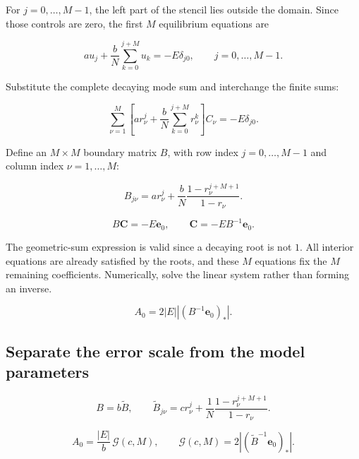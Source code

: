\documentclass[10pt,a4paper]{article}
\begin{document}
For $j=0,\ldots,M-1$, the left part of the stencil
lies outside the domain.
Since those controls are zero, the first $M$
equilibrium equations are

\begin{equation}
a u_j
+
\frac{b}{N}\sum_{k=0}^{j+M}u_k
=
-E\delta_{j0},
\qquad
j=0,\ldots,M-1.
\end{equation}

Substitute the complete decaying mode sum and
interchange the finite sums:

\begin{equation}
\sum_{\nu=1}^{M}
\left[
a r_\nu^j
+
\frac{b}{N}\sum_{k=0}^{j+M}r_\nu^k
\right]C_\nu
=
-E\delta_{j0}.
\end{equation}

Define an $M\times M$ boundary matrix $B$,
with row index $j=0,\ldots,M-1$ and
column index $\nu=1,\ldots,M$:

\begin{equation}
B_{j\nu}
=
a r_\nu^j
+
\frac{b}{N}
\frac{1-r_\nu^{j+M+1}}{1-r_\nu}.
\end{equation}

\begin{equation}
B\mathbf C=-E\mathbf e_0,
\qquad
\mathbf C=-E B^{-1}\mathbf e_0.
\end{equation}

The geometric-sum expression is valid since a
decaying root is not $1$.
All interior equations are already satisfied
by the roots, and these $M$ equations fix the
$M$ remaining coefficients.
Numerically, solve the linear system rather than
forming an inverse.

\begin{equation}
A_0
=
2|E|
\left|
\left(B^{-1}\mathbf e_0\right)_*
\right|.
\end{equation}

\subsection*{Separate the error scale from the model parameters}

\begin{equation}
B=b\widetilde B,
\qquad
\widetilde B_{j\nu}
=
c r_\nu^j
+
\frac{1}{N}
\frac{1-r_\nu^{j+M+1}}{1-r_\nu}.
\end{equation}

\begin{equation}
\boxed{
A_0=\frac{|E|}{b}\,\mathcal G(c,M),
\qquad
\mathcal G(c,M)
=
2\left|
\left(\widetilde B^{-1}\mathbf e_0\right)_*
\right|.
}
\end{equation}
\end{document}
